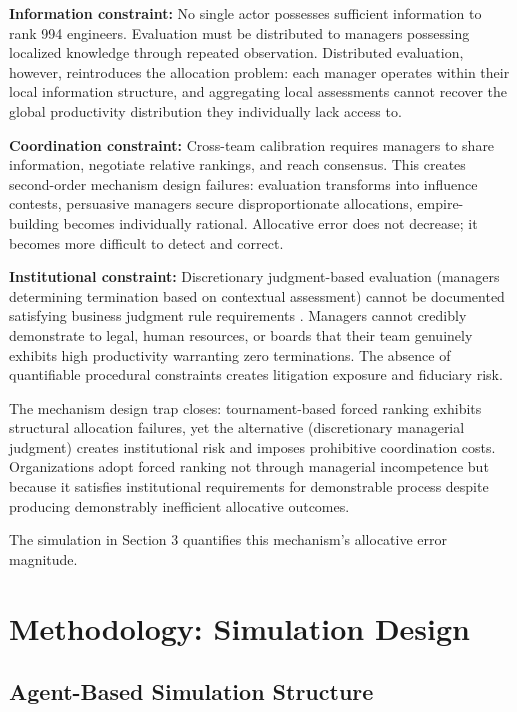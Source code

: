 \documentclass[12pt]{article}
\begin{document}
\textbf{Information constraint:} No single actor possesses sufficient information to rank 994 engineers. Evaluation must be distributed to managers possessing localized knowledge through repeated observation. Distributed evaluation, however, reintroduces the allocation problem: each manager operates within their local information structure, and aggregating local assessments cannot recover the global productivity distribution they individually lack access to.

\textbf{Coordination constraint:} Cross-team calibration requires managers to share information, negotiate relative rankings, and reach consensus. This creates second-order mechanism design failures: evaluation transforms into influence contests, persuasive managers secure disproportionate allocations, empire-building becomes individually rational. Allocative error does not decrease; it becomes more difficult to detect and correct.

\textbf{Institutional constraint:} Discretionary judgment-based evaluation (managers determining termination based on contextual assessment) cannot be documented satisfying business judgment rule requirements \citep{smith2015modern}. Managers cannot credibly demonstrate to legal, human resources, or boards that their team genuinely exhibits high productivity warranting zero terminations. The absence of quantifiable procedural constraints creates litigation exposure and fiduciary risk.

The mechanism design trap closes: tournament-based forced ranking exhibits structural allocation failures, yet the alternative (discretionary managerial judgment) creates institutional risk and imposes prohibitive coordination costs. Organizations adopt forced ranking not through managerial incompetence but because it satisfies institutional requirements for demonstrable process despite producing demonstrably inefficient allocative outcomes.

The simulation in Section 3 quantifies this mechanism's allocative error magnitude.

\section{Methodology: Simulation Design}

\subsection{Agent-Based Simulation Structure}
\end{document}
